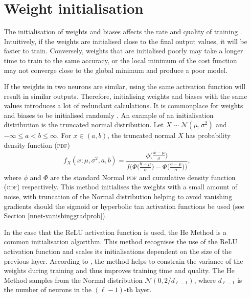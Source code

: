 \section{Weight initialisation}

The initialisation of weights and biases affects the rate and quality of training \citep{Mishkin2016}. Intuitively, if the weights are initialised close to the final output values, it will be faster to train. Conversely, weights that are initialised poorly may take a longer time to train to the same accuracy, or the local minimum of the cost function may not converge close to the global minimum and produce a poor model.

If the weights in two neurons are similar, using the same activation function will result in similar outputs. Therefore, initialising weights and biases with the same values introduces a lot of redundant calculations. It is commonplace for weights and biases to be initialised randomly \citep{Nielson2015}. An example of an initialisation distribution is the truncated normal distribution. Let $X\sim\mathcal{N}(\mu,\sigma^2)$ and $-\infty \le a < b \le \infty$. For $x \in (a,b)$, the truncated normal $X$ has probability density function (\textsc{pdf})
\begin{align*}
	f_X(x;\mu, \sigma^2,a,b) = \dfrac{\phi\big(\frac{x-\mu}{\sigma}\big)}{f\bigg(\Phi\big(\frac{b-\mu}{\sigma}\big) - \Phi\big(\frac{a-\mu}{\sigma}\big)\bigg)},
\end{align*}
where $\phi$ and $\Phi$ are the standard Normal \textsc{pdf} and cumulative density function (\textsc{cdf}) respectively. This method initialises the weights with a small amount of noise, with truncation of the Normal distribution helping to avoid vanishing gradients should the sigmoid or hyperbolic tan activation functions be used (see Section \ref{nnet-vanishinggradprob}).

In the case that the ReLU activation function is used, the He Method \citep{HeKaiming2015DDiR} is a common initialisation algorithm. This method recognises the use of the ReLU activation function and scales its initialisations dependent on the size of the previous layer. According to \cite{HeKaiming2015DDiR}, the method helps to constrain the variance of the weights during training and thus improves training time and quality. The He Method samples from the Normal distribution $\mathcal{N}\left(0, 2/d_{\ell-1}\right)$, where $d_{\ell-1}$ is the number of neurons in the $(\ell-1)$-th layer.


